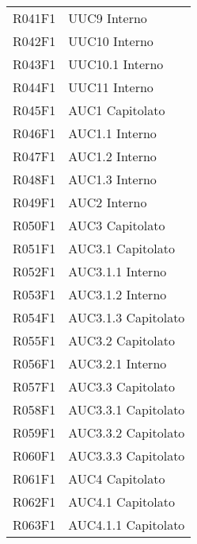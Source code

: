\documentclass[../analisi-dei-requisiti.tex]{subfiles}
\begin{document}
\begin{longtable}[H]{ p{4cm} | p{4cm} }
  R041F1                               & UUC9 Interno                  \\
  R042F1                               & UUC10 Interno                 \\
  R043F1                               & UUC10.1 Interno               \\
  R044F1                               & UUC11 Interno                 \\
  R045F1                               & AUC1 Capitolato               \\
  R046F1                               & AUC1.1 Interno                \\
  R047F1                               & AUC1.2 Interno                \\
  R048F1                               & AUC1.3 Interno                \\
  R049F1                               & AUC2 Interno                  \\
  R050F1                               & AUC3 Capitolato               \\
  R051F1                               & AUC3.1 Capitolato             \\
  R052F1                               & AUC3.1.1 Interno              \\
  R053F1                               & AUC3.1.2 Interno              \\
  R054F1                               & AUC3.1.3 Capitolato           \\
  R055F1                               & AUC3.2 Capitolato             \\
  R056F1                               & AUC3.2.1 Interno              \\
  R057F1                               & AUC3.3 Capitolato             \\
  R058F1                               & AUC3.3.1 Capitolato           \\
  R059F1                               & AUC3.3.2 Capitolato           \\
  R060F1                               & AUC3.3.3 Capitolato           \\
  R061F1                               & AUC4 Capitolato               \\
  R062F1                               & AUC4.1 Capitolato             \\
  R063F1                               & AUC4.1.1 Capitolato           \\

\end{longtable}
\end{document}
